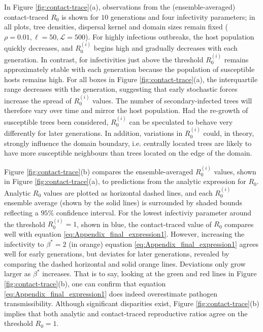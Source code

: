 In Figure \ref{fig:contact-trace}(a), observations from the (ensemble-averaged) contact-traced $R_0$ is shown for $10$ generations and 
four infectivity parameters; in all plots, tree densities, dispersal kernel and domain sizes remain fixed ($\rho=0.01, \ell=50, \mathcal{L}=500$).
For highly infectious outbreaks, the host population quickly decreases, and $R^{(i)}_0$ begins high and gradually decreases with each generation.
In contrast, for infectivities just above the threshold $R^{(i)}_0$ remains approximately stable with each generation because the population of susceptible hosts remains high.  
For all boxes in Figure \ref{fig:contact-trace}(a), the interquartile range decreases with the generation, suggesting that early stochastic forces increase the spread of $R^{(i)}_0$ values.
The number of secondary-infected trees will therefore vary over time and mirror the host population.
Had the re-growth of susceptible trees been considered, $R^{(i)}_0$ can be speculated to behave very differently for later generations.
In addition, variations in $R^{(i)}_0$ could, in theory, strongly influence the domain boundary, i.e. centrally located trees are likely to have more susceptible neighbours than trees located on the edge of the domain.


Figure \ref{fig:contact-trace}(b) compares the ensemble-averaged $R^{(i)}_0$ values, shown in Figure \ref{fig:contact-trace}(a),
to predictions from the analytic expression for $R_0$.
Analytic $R_0$ values are plotted as horizontal dashed lines, and each $R_0^{(i)}$ ensemble average (shown by the solid lines) is surrounded by shaded bounds reflecting a $95\%$ confidence interval.
For the lowest infectiviy parameter around the threshold $R^{(i)}_0=1$, shown in blue, the contact-traced value of $R_0$ compares well with equation \ref{eq:Appendix_final_expression1}.
However, increasing the infectivity to $\beta^*=2$ (in orange) equation \ref{eq:Appendix_final_expression1} agrees well for early generations, but deviates for later generations, 
revealed by comparing the dashed horizontal and solid orange lines.
Deviations only grow larger as $\beta^*$ increases.
That is to say, looking at the green and red lines in Figure \ref{fig:contact-trace}(b), one can confirm that equation \ref{eq:Appendix_final_expression1} does indeed overestimate pathogen transmissibility.
Although significant disparities exist, Figure \ref{fig:contact-trace}(b) implies that both analytic and contact-traced reproductive ratios agree on the threshold $R_0=1$.

